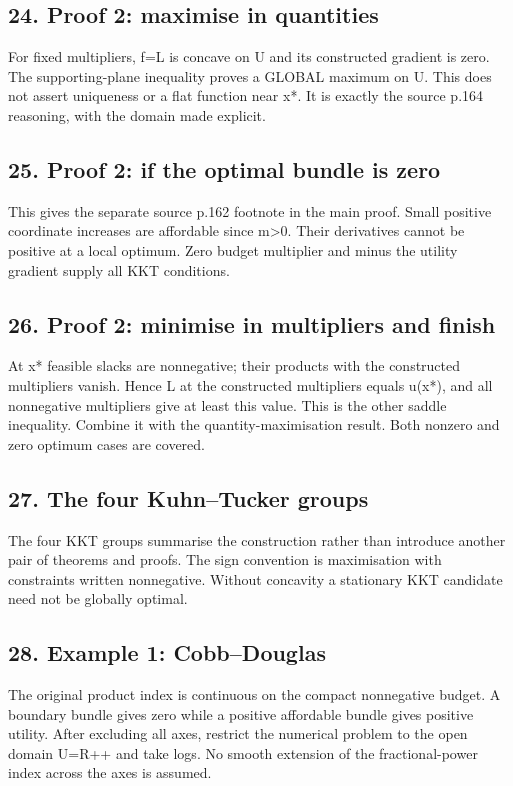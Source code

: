 \documentclass[11pt,a4paper]{article}
\begin{document}
\subsection*{24. Proof 2: maximise in quantities}
For fixed multipliers, f=L is concave on U and its constructed gradient is zero. The supporting-plane inequality proves a GLOBAL maximum on U. This does not assert uniqueness or a flat function near x*. It is exactly the source p.164 reasoning, with the domain made explicit.

\subsection*{25. Proof 2: if the optimal bundle is zero}
This gives the separate source p.162 footnote in the main proof. Small positive coordinate increases are affordable since m>0. Their derivatives cannot be positive at a local optimum. Zero budget multiplier and minus the utility gradient supply all KKT conditions.

\subsection*{26. Proof 2: minimise in multipliers and finish}
At x* feasible slacks are nonnegative; their products with the constructed multipliers vanish. Hence L at the constructed multipliers equals u(x*), and all nonnegative multipliers give at least this value. This is the other saddle inequality. Combine it with the quantity-maximisation result. Both nonzero and zero optimum cases are covered.

\subsection*{27. The four Kuhn--Tucker groups}
The four KKT groups summarise the construction rather than introduce another pair of theorems and proofs. The sign convention is maximisation with constraints written nonnegative. Without concavity a stationary KKT candidate need not be globally optimal.

\subsection*{28. Example 1: Cobb--Douglas}
The original product index is continuous on the compact nonnegative budget. A boundary bundle gives zero while a positive affordable bundle gives positive utility. After excluding all axes, restrict the numerical problem to the open domain U=R++ and take logs. No smooth extension of the fractional-power index across the axes is assumed.
\end{document}
